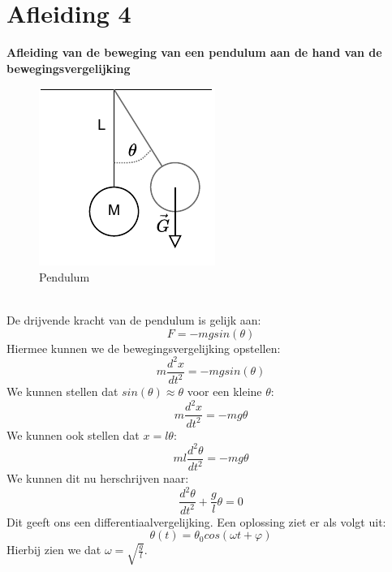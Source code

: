 \documentclass[a4paper,kul]{kulakarticle} %
\begin{document}
\section{Afleiding 4}
\textbf{Afleiding van de beweging van een pendulum aan de hand van de bewegingsvergelijking}
\begin{figure}[htbp]
	\centering
	\includegraphics[width=0.5\linewidth]{Pendulum}
	\caption[Pendulum]{Pendulum}
	\label{fig:pendulum}
\end{figure} \\
De drijvende kracht van de pendulum is gelijk aan:
\begin{equation*}
	F = -mg sin(\theta)
\end{equation*}
Hiermee kunnen we de bewegingsvergelijking opstellen:
\begin{equation*}
	m\frac{d^2x}{dt^2} = -mgsin(\theta)
\end{equation*}
We kunnen stellen dat $sin(\theta) \approx \theta$ voor een kleine $\theta$:
\begin{equation*}
	m\frac{d^2x}{dt^2} = -mg\theta
\end{equation*}
We kunnen ook stellen dat $x = l\theta$:
\begin{equation*}
	ml\frac{d^2\theta}{dt^2} = -mg\theta
\end{equation*}
We kunnen dit nu herschrijven naar:
\begin{equation*}
	\frac{d^2\theta}{dt^2} +\frac{g}{l}\theta = 0
\end{equation*}
Dit geeft ons een differentiaalvergelijking. Een oplossing ziet er als volgt uit:
\begin{equation*}
	\theta (t) = \theta_0 cos(\omega t +\varphi)
\end{equation*}
Hierbij zien we dat $\omega = \sqrt{\frac{g}{l}}$.
\newpage
\end{document}
